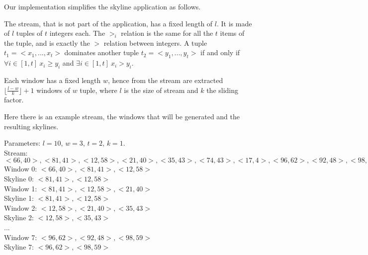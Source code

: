 \bigskip\noindent
Our implementation simplifies the skyline application as follows.

The stream, that is not part of the application, has a fixed length of $l$. It is made of $l$ tuples of $t$ integers each. The $>_i$ relation is the same for all the $t$ items of the tuple, and is exactly the $>$ relation between integers. A tuple $t_1 = <x_1, ... , x_t>$ dominates another tuple $t_2 = <y_1, ... , y_t>$ if and only if $\forall i \in [1, t] \ x_i \geq y_i$ and $\exists i \in [1, t] \ x_i > y_i$.

Each window has a fixed length $w$, hence from the stream are extracted $\lfloor\frac{l-w}{k}\rfloor+1$ windows of $w$ tuple, where $l$ is the size of stream and $k$ the sliding factor.

\bigskip\noindent
Here there is an example stream, the windows that will be generated and the resulting skylines.

\medskip\noindent
Parameters: $l = 10$, $w = 3$, $t = 2$, $k = 1$. \medskip \\
Stream: $<66,40>, <81,41>, <12,58>, <21,40>, <35,43>, <74,43>, <17,4>, <96,62>, <92,48>, <98,59>$ \medskip \\
Window 0: $<66,40>, <81,41>, <12,58>$ \\
Skyline 0: $<81,41>, <12,58>$ \medskip \\
Window 1: $<81,41>, <12,58>, <21,40>$ \\
Skyline 1: $<81,41>, <12,58>$ \medskip \\
Window 2: $<12,58>, <21,40>, <35,43>$ \\
Skyline 2: $<12,58>, <35,43>$ \smallskip \\
... \smallskip \\
Window 7: $<96,62>, <92,48>, <98,59>$ \\
Skyline 7: $<96,62>, <98,59>$